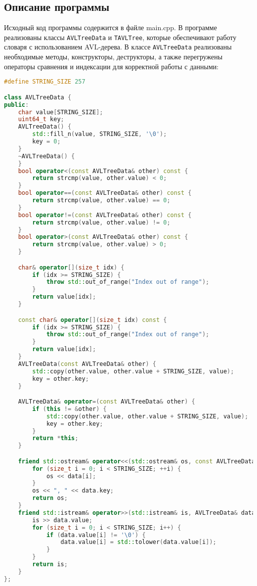 \documentclass[12pt]{article}
\begin{document}
\subsection*{Описание программы}

Исходный код программы содержится в файле main.cpp. В программе реализованы классы \texttt{AVLTreeData} и \texttt{TAVLTree}, которые обеспечивают работу словаря с использованием AVL-дерева. В классе \texttt{AVLTreeData} реализованы необходимые методы, конструкторы, деструкторы, а также перегружены операторы сравнения и индексации для корректной работы с данными:

\begin{lstlisting}[language=C++]
#define STRING_SIZE 257

class AVLTreeData {
public:
    char value[STRING_SIZE];
    uint64_t key;
    AVLTreeData() {
        std::fill_n(value, STRING_SIZE, '\0');
        key = 0;
    }
    ~AVLTreeData() {
    }
    bool operator<(const AVLTreeData& other) const {
        return strcmp(value, other.value) < 0;
    }
    bool operator==(const AVLTreeData& other) const {
        return strcmp(value, other.value) == 0;
    }
    bool operator!=(const AVLTreeData& other) const {
        return strcmp(value, other.value) != 0;
    }
    bool operator>(const AVLTreeData& other) const {
        return strcmp(value, other.value) > 0;
    }

    char& operator[](size_t idx) {
        if (idx >= STRING_SIZE) {
            throw std::out_of_range("Index out of range");
        }
        return value[idx];
    }

    const char& operator[](size_t idx) const {
        if (idx >= STRING_SIZE) {
            throw std::out_of_range("Index out of range");
        }
        return value[idx];
    }
    AVLTreeData(const AVLTreeData& other) {
        std::copy(other.value, other.value + STRING_SIZE, value);
        key = other.key;
    }

    AVLTreeData& operator=(const AVLTreeData& other) {
        if (this != &other) {
            std::copy(other.value, other.value + STRING_SIZE, value);
            key = other.key;
        }
        return *this;
    }

    friend std::ostream& operator<<(std::ostream& os, const AVLTreeData& data) {
        for (size_t i = 0; i < STRING_SIZE; ++i) {
            os << data[i];
        }
        os << ", " << data.key;
        return os;
    }
    friend std::istream& operator>>(std::istream& is, AVLTreeData& data) {
        is >> data.value;
        for (size_t i = 0; i < STRING_SIZE; i++) {
            if (data.value[i] != '\0') {
                data.value[i] = std::tolower(data.value[i]);
            }
        }
        return is;
    }
};
\end{lstlisting}
\end{document}

